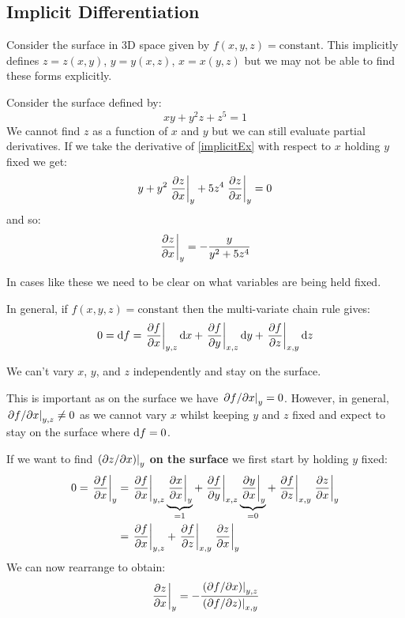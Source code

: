 \documentclass[../main.tex]{subfiles}
\begin{document}
\subsection{Implicit Differentiation}
Consider the surface in 3D space given by $f(x, y, z) = \text{constant}$.
This implicitly defines $z = z(x, y)$, $y = y(x, z)$, $x = x(y, z)$ but we may not be able to find these forms explicitly.
\begin{example}
  Consider the surface defined by:
  \begin{equation}
    xy + y^2 z + z^5 = 1
    \label{implicitEx}
  \end{equation}
  We cannot find $z$ as a function of $x$ and $y$ but we can still evaluate partial derivatives.
  If we take the derivative of \cref{implicitEx} with respect to $x$ holding $y$ fixed we get:
  \[
    y + y^2 \at{\pderiv{z}{x}}{y} + 5z^4 \at{\pderiv{z}{x}}{y} = 0
  \]
  and so:
  \[
    \at{\pderiv{z}{x}}{y} = -\frac{y}{y^2 + 5z^4}
  \]
\end{example}
\begin{remark}[Warning]
  In cases like these we need to be clear on what variables are being held fixed.
\end{remark}
In general, if $f(x, y, z) = \text{constant}$ then the multi-variate chain rule gives:
\[
  0 = \d{f} = \at{\pderiv{f}{x}}{y, z} \d{x} + \at{\pderiv{f}{y}}{x, z} \d{y} + \at{\pderiv{f}{z}}{x, y} \d{z}
\]
\begin{remark}[Warning]
  We can't vary $x$, $y$, and $z$ independently and stay on the surface.

  This is important as on the surface we have $\left. \partial f/\partial x \right|_{y} = 0$.
  However, in general, $\left. \partial f/\partial x \right|_{y, z} \neq 0$ as we cannot vary $x$ whilst keeping $y$ and $z$ fixed and expect to stay on the surface where $\d{f} = 0$.
\end{remark}
If we want to find $\left. (\partial z/\partial x) \right|_{y}$ \textbf{on the surface} we first start by holding $y$ fixed:
\begin{align*}
  0 = \at{\pderiv{f}{x}}{y} &= \at{\pderiv{f}{x}}{y,z} \underbrace{\at{\pderiv{x}{x}}{y}}_{=1} + \at{\pderiv{f}{y}}{x,z} \underbrace{\at{\pderiv{y}{x}}{y}}_{=0} + \at{\pderiv{f}{z}}{x, y} \at{\pderiv{z}{x}}{y} \\
                            &=\at{\pderiv{f}{x}}{y,z} + \at{\pderiv{f}{z}}{x, y} \at{\pderiv{z}{x}}{y}
\end{align*}
We can now rearrange to obtain:
\[
  \at{\pderiv{z}{x}}{y} = -\frac{\at{(\partial f/\partial x)}{y, z}}{\at{(\partial f/\partial z)}{x, y}}
\]
\end{document}
